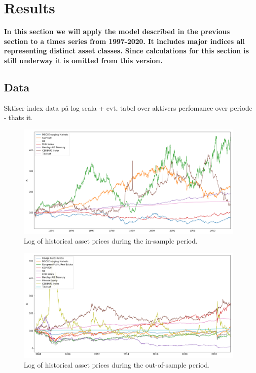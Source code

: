 \section{Results}

\textbf{In this section we will apply the model described in the previous section to a times series from 1997-2020. It includes major indices all representing distinct asset classes. Since calculations for this section is still underway it is omitted from this version.}


\subsection{Data}

Sktiser index data på log scala + evt. tabel over aktivers perfomance over periode - thats it.

\begin{figure}[H]
    \centering
    \includegraphics[width=1\textwidth]{analysis/portfolio_exercise/images/asset_vals_insample.png}
    \caption[Historical asset prices during the in-sample period]{Log of historical asset prices during the in-sample period.}
    \label{fig:MPC_data}
\end{figure}


\begin{figure}[H]
    \centering
    \includegraphics[width=1\textwidth]{analysis/portfolio_exercise/images/asset_vals_oos.png}
    \caption[Historical asset prices during the out-of-sample period]{Log of historical asset prices during the out-of-sample period.}
    \label{fig:MPC_data}
\end{figure}

